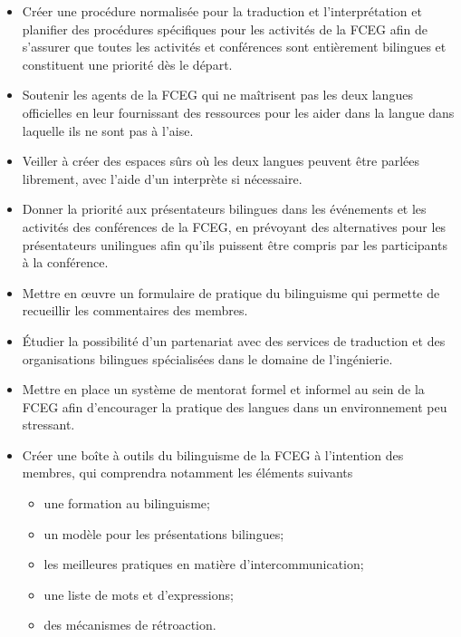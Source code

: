 \begin{itemize}
 \item Créer une procédure normalisée pour la traduction et l'interprétation et planifier des procédures spécifiques pour les activités de la FCEG afin de s'assurer que toutes les activités et conférences sont entièrement bilingues et constituent une priorité dès le départ.
 \item Soutenir les agents de la FCEG qui ne maîtrisent pas les deux langues officielles en leur fournissant des ressources pour les aider dans la langue dans laquelle ils ne sont pas à l'aise.
 \item Veiller à créer des espaces sûrs où les deux langues peuvent être parlées librement, avec l'aide d'un interprète si nécessaire.
 \item Donner la priorité aux présentateurs bilingues dans les événements et les activités des conférences de la FCEG, en prévoyant des alternatives pour les présentateurs unilingues afin qu'ils puissent être compris par les participants à la conférence.
 \item Mettre en œuvre un formulaire de pratique du bilinguisme qui permette de recueillir les commentaires des membres.
 \item Étudier la possibilité d'un partenariat avec des services de traduction et des organisations bilingues spécialisées dans le domaine de l'ingénierie.
 \item Mettre en place un système de mentorat formel et informel au sein de la FCEG afin d'encourager la pratique des langues dans un environnement peu stressant.
 \item Créer une boîte à outils du bilinguisme de la FCEG à l'intention des membres, qui comprendra notamment les éléments suivants
 \begin{itemize}
  \item une formation au bilinguisme;
  \item un modèle pour les présentations bilingues;
  \item les meilleures pratiques en matière d'intercommunication;
  \item une liste de mots et d'expressions;
  \item des mécanismes de rétroaction.
 \end{itemize}
\end{itemize}

\newpage
